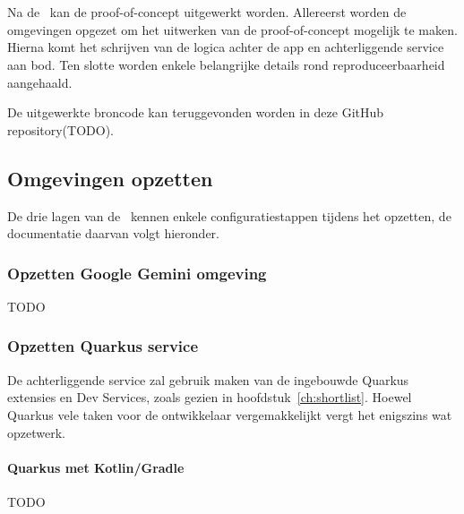 
\chapter{}
\label{ch:proof-of-concept}
Na de~ kan de proof-of-concept uitgewerkt worden.
Allereerst worden de omgevingen opgezet om het uitwerken van de proof-of-concept mogelijk te maken.
Hierna komt het schrijven van de logica achter de app en achterliggende service aan bod.
Ten slotte worden enkele belangrijke details rond reproduceerbaarheid aangehaald.

De uitgewerkte broncode kan teruggevonden worden in deze GitHub repository(TODO). %

\section{Omgevingen opzetten}
\label{sec:omgevingen-opzetten}
De drie lagen van de~ kennen enkele configuratiestappen tijdens het opzetten, de documentatie daarvan volgt hieronder.

\subsection{Opzetten Google Gemini omgeving}
\label{subsec:opzetten-google-gemini-omgeving}
TODO

\subsection{Opzetten Quarkus service}
\label{subsec:opzetten-quarkus-service}
De achterliggende service zal gebruik maken van de ingebouwde Quarkus extensies en Dev Services, zoals gezien in hoofdstuk~\ref{ch:shortlist}.
Hoewel Quarkus vele taken voor de ontwikkelaar vergemakkelijkt vergt het enigszins wat opzetwerk.

\subsubsection{Quarkus met Kotlin/Gradle}
TODO

